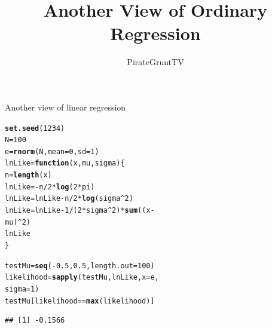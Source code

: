 \documentclass[xcolor=dvipsnames]{beamer}\usepackage[]{graphicx}\usepackage[]{color}
\makeatletter
\newcommand{\hlnum}[1]{\textcolor[rgb]{0.686,0.059,0.569}{#1}}%
\newcommand{\hlopt}[1]{\textcolor[rgb]{0,0,0}{#1}}%
\newcommand{\hlstd}[1]{\textcolor[rgb]{0.345,0.345,0.345}{#1}}%
\newcommand{\hlkwa}[1]{\textcolor[rgb]{0.161,0.373,0.58}{\textbf{#1}}}%
\newcommand{\hlkwb}[1]{\textcolor[rgb]{0.69,0.353,0.396}{#1}}%
\newcommand{\hlkwc}[1]{\textcolor[rgb]{0.333,0.667,0.333}{#1}}%
\newcommand{\hlkwd}[1]{\textcolor[rgb]{0.737,0.353,0.396}{\textbf{#1}}}%
\newenvironment{kframe}{%
 \def\at@end@of@kframe{}%
 \ifinner\ifhmode%
  \def\at@end@of@kframe{\end{minipage}}%
  \begin{minipage}{\columnwidth}%
 \fi\fi%
 \def\FrameCommand##1{\hskip\@totalleftmargin \hskip-\fboxsep
 \colorbox{shadecolor}{##1}\hskip-\fboxsep
     \hskip-\linewidth \hskip-\@totalleftmargin \hskip\columnwidth}%
 \MakeFramed {\advance\hsize-\width
   \@totalleftmargin\z@ \linewidth\hsize
   \@setminipage}}%
 {\par\unskip\endMakeFramed%
 \at@end@of@kframe}
\newenvironment{knitrout}{}{} %
\makeatother
\begin{document}
\title{Another View of Ordinary Regression}
\author{PirateGruntTV}

\maketitle





\begin{frame}[fragile]{Another view of linear regression}
\begin{knitrout}
\color{fgcolor}\begin{kframe}
\begin{alltt}
\hlkwd{set.seed}\hlstd{(}\hlnum{1234}\hlstd{)}
\hlstd{N} \hlkwb{=} \hlnum{100}
\hlstd{e} \hlkwb{=} \hlkwd{rnorm}\hlstd{(N,} \hlkwc{mean} \hlstd{=} \hlnum{0}\hlstd{,} \hlkwc{sd} \hlstd{=} \hlnum{1}\hlstd{)}
\hlstd{lnLike} \hlkwb{=} \hlkwa{function}\hlstd{(}\hlkwc{x}\hlstd{,} \hlkwc{mu}\hlstd{,} \hlkwc{sigma}\hlstd{) \{}
    \hlstd{n} \hlkwb{=} \hlkwd{length}\hlstd{(x)}
    \hlstd{lnLike} \hlkwb{=} \hlopt{-}\hlstd{n}\hlopt{/}\hlnum{2} \hlopt{*} \hlkwd{log}\hlstd{(}\hlnum{2} \hlopt{*} \hlstd{pi)}
    \hlstd{lnLike} \hlkwb{=} \hlstd{lnLike} \hlopt{-} \hlstd{n}\hlopt{/}\hlnum{2} \hlopt{*} \hlkwd{log}\hlstd{(sigma}\hlopt{^}\hlnum{2}\hlstd{)}
    \hlstd{lnLike} \hlkwb{=} \hlstd{lnLike} \hlopt{-} \hlnum{1}\hlopt{/}\hlstd{(}\hlnum{2} \hlopt{*} \hlstd{sigma}\hlopt{^}\hlnum{2}\hlstd{)} \hlopt{*} \hlkwd{sum}\hlstd{((x} \hlopt{-}
        \hlstd{mu)}\hlopt{^}\hlnum{2}\hlstd{)}
    \hlstd{lnLike}
\hlstd{\}}
\end{alltt}
\end{kframe}
\end{knitrout}

\end{frame}

\begin{frame}[fragile]
\begin{knitrout}
\color{fgcolor}\begin{kframe}
\begin{alltt}
\hlstd{testMu} \hlkwb{=} \hlkwd{seq}\hlstd{(}\hlopt{-}\hlnum{0.5}\hlstd{,} \hlnum{0.5}\hlstd{,} \hlkwc{length.out} \hlstd{=} \hlnum{100}\hlstd{)}
\hlstd{likelihood} \hlkwb{=} \hlkwd{sapply}\hlstd{(testMu, lnLike,} \hlkwc{x} \hlstd{= e,}
    \hlkwc{sigma} \hlstd{=} \hlnum{1}\hlstd{)}
\hlstd{testMu[likelihood} \hlopt{==} \hlkwd{max}\hlstd{(likelihood)]}
\end{alltt}
\begin{verbatim}
## [1] -0.1566
\end{verbatim}
\end{kframe}
\end{knitrout}

\end{frame}
\end{document}
